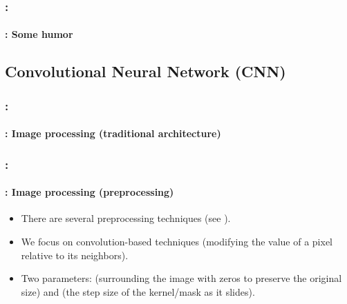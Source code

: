 \documentclass[xcolor=table]{beamer}
\begin{document}
\begin{frame}
	\frametitle{\insertshortsubtitle: \insertsection}
	\framesubtitle{\insertsubsection: Some humor}

	\begin{center}
	\end{center}

\end{frame}

\subsection{Convolutional Neural Network (CNN)}

\begin{frame}
	\frametitle{\insertshortsubtitle: \insertsection}
	\framesubtitle{\insertsubsection: Image processing (traditional architecture)}

	\begin{center}
	\end{center}

\end{frame}

\begin{frame}
	\frametitle{\insertshortsubtitle: \insertsection}
	\framesubtitle{\insertsubsection: Image processing (preprocessing)}
	
	\begin{itemize}
		\item There are several preprocessing techniques (see \cite{2010-alginahi}).
		\item We focus on convolution-based techniques (modifying the value of a pixel relative to its neighbors).
		\item Two parameters:  (surrounding the image with zeros to preserve the original size) and  (the step size of the kernel/mask as it slides).
	\end{itemize}

	\begin{center}
	\end{center}

\end{frame}
\end{document}
